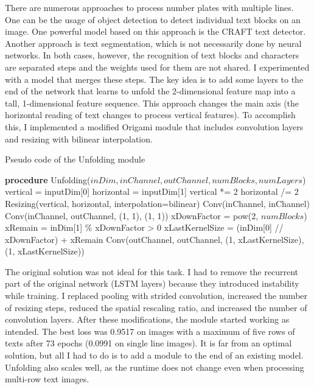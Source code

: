 There are numerous approaches to process number plates with multiple lines. One can be the usage of object detection to detect individual text blocks on an image. One powerful model based on this approach is the CRAFT\cite{CRAFT} text detector. Another approach is text segmentation, which is not necessarily done by neural networks. In both cases, however, the recognition of text blocks and characters are separated steps and the weights used for them are not shared. I experimented with a model that merges these steps. The key idea is to add some layers to the end of the network that learns to unfold the 2-dimensional feature map into a tall, 1-dimensional feature sequence. This approach changes the main axis (the horizontal reading of text changes to process vertical features). To accomplish this, I implemented a modified Origami\cite{OrigamiNet} module that includes convolution layers and resizing with bilinear interpolation.

 \begin{algorithm}
     \caption{Pseudo code of the Unfolding module}
 \begin{algorithmic}[1]
  \label{alg:alg}
    \STATE \textbf{procedure} Unfolding($inDim, inChannel, outChannel, numBlocks, numLayers$)
    \STATE vertical = inputDim[0]
    \STATE horizontal = inputDim[1]
    \STATE vertical *= 2
    \STATE horizontal /= 2
    \STATE Resizing(vertical, horizontal, interpolation=bilinear)
    \STATE Conv(inChannel, inChannel)
    \ENDFOR
    \ENDFOR
    \STATE Conv(inChannel, outChannel, (1, 1), (1, 1))
    \STATE xDownFactor = pow(2, $numBlocks$)
    \STATE xRemain = inDim[1] \% xDownFactor > 0
    \STATE xLastKernelSize = (inDim[0] // xDownFactor) + xRemain
    \STATE Conv(outChannel, outChannel, (1, xLastKernelSize), (1, xLastKernelSize))
\end{algorithmic}
\end{algorithm}

The original solution was not ideal for this task. I had to remove the recurrent part of the original network (LSTM layers) because they introduced instability while training. I replaced pooling with strided convolution, increased the number of resizing steps, reduced the spatial rescaling ratio, and increased the number of convolution layers. After these modifications, the module started working as intended. The best loss was 0.9517 on images with a maximum of five rows of texts after 73 epochs (0.0991 on single line images). It is far from an optimal solution, but all I had to do is to add a module to the end of an existing model. Unfolding also scales well, as the runtime does not change even when processing multi-row text images.

